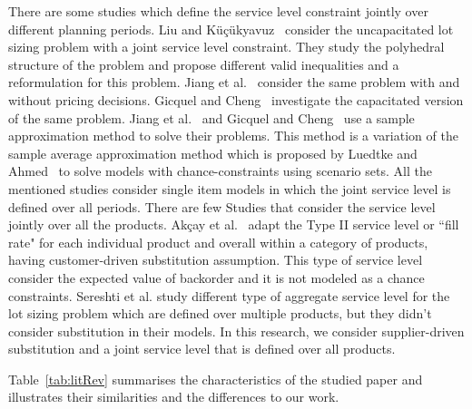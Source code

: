 \documentclass[11pt]{article}
\begin{document}
There are some studies which define the service level constraint jointly over different planning periods. Liu and K{\"u}{\c{c}}{\"u}kyavuz~\cite{liu2018polyhedral} consider the uncapacitated lot sizing problem with a joint service level constraint. They study the polyhedral structure of the problem and propose different valid inequalities and a reformulation for this problem. Jiang et al.~\cite{jiang2017production} consider the same problem with and without pricing decisions. Gicquel and Cheng~\cite{gicquel2018joint} investigate the capacitated version of the same problem. Jiang et al.~\cite{jiang2017production} and Gicquel and Cheng~\cite{gicquel2018joint} use a sample approximation method to solve their problems. This method is a variation of the sample average approximation method which is proposed by Luedtke and Ahmed~\cite{luedtke2008sample} to solve models with chance-constraints using scenario sets. All the mentioned studies consider single item models in which the joint service level is defined over all periods. There are few Studies that consider the service level jointly over all the products. Akçay et al.~\cite{akccaycategory} adapt the Type II service level or ``fill rate" for each individual product and overall within a category of products, having customer-driven substitution assumption. This type of service level consider the expected value of backorder and it is not modeled as a chance constraints. Sereshti et al. study different type of aggregate service level for the lot sizing problem which are defined over multiple products, but they didn't consider substitution in their models. In this research, we consider supplier-driven substitution and a joint service level that is defined over all products.

Table~\ref{tab:litRev} summarises the characteristics of the studied paper and illustrates their similarities and the differences to our work.  
\end{document}
